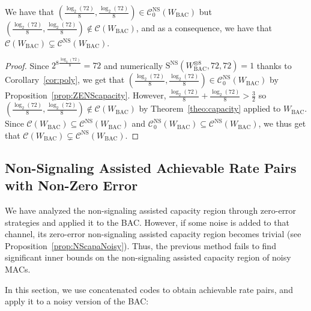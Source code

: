   \begin{theorem}
    \label{theo:BAC}
    We have that $\left(\frac{\log_2(72)}{8},\frac{\log_2(72)}{8}\right) \in \mathcal{C}^{\mathrm{NS}}_0(W_{\mathrm{BAC}})$ but $\left(\frac{\log_2(72)}{8},\frac{\log_2(72)}{8}\right) \not\in \mathcal{C}(W_{\mathrm{BAC}})$, and as a consequence, we have that $\mathcal{C}(W_{\mathrm{BAC}}) \subsetneq \mathcal{C}^{\mathrm{NS}}(W_{\mathrm{BAC}})$.
  \end{theorem}
  \begin{proof}
    Since $2^{8\frac{\log_2(72)}{8}}=72$ and numerically $\mathrm{S}^{\mathrm{NS}}(W^{\otimes 8}_{\mathrm{BAC}},72,72)=1$ thanks to Corollary~\ref{cor:poly}, we get that  $\left(\frac{\log_2(72)}{8},\frac{\log_2(72)}{8}\right) \in \mathcal{C}^{\mathrm{NS}}_0(W_{\mathrm{BAC}})$ by Proposition~\ref{prop:ZENScapacity}. However, $\frac{\log_2(72)}{8}+\frac{\log_2(72)}{8} > \frac{3}{2}$ so $\left(\frac{\log_2(72)}{8},\frac{\log_2(72)}{8}\right) \not\in \mathcal{C}(W_{\mathrm{BAC}})$ by Theorem~\ref{theo:capacity} applied to $W_{\mathrm{BAC}}$. Since $\mathcal{C}(W_{\mathrm{BAC}}) \subseteq \mathcal{C}^{\mathrm{NS}}(W_{\mathrm{BAC}})$ and $\mathcal{C}^{\mathrm{NS}}_0(W_{\mathrm{BAC}}) \subseteq \mathcal{C}^{\mathrm{NS}}(W_{\mathrm{BAC}})$, we thus get that $\mathcal{C}(W_{\mathrm{BAC}}) \subsetneq \mathcal{C}^{\mathrm{NS}}(W_{\mathrm{BAC}})$.
  \end{proof}

  \subsection{Non-Signaling Assisted Achievable Rate Pairs with Non-Zero Error}
  We have analyzed the non-signaling assisted capacity region through zero-error strategies and applied it to the BAC. However, if some noise is added to that channel, its zero-error non-signaling assisted capacity region becomes trivial (see Proposition~\ref{prop:NScapaNoisy}). Thus, the previous method fails to find significant inner bounds on the non-signaling assisted capacity region of noisy MACs.

  In this section, we use concatenated codes to obtain achievable rate pairs, and apply it to a noisy version of the BAC:

